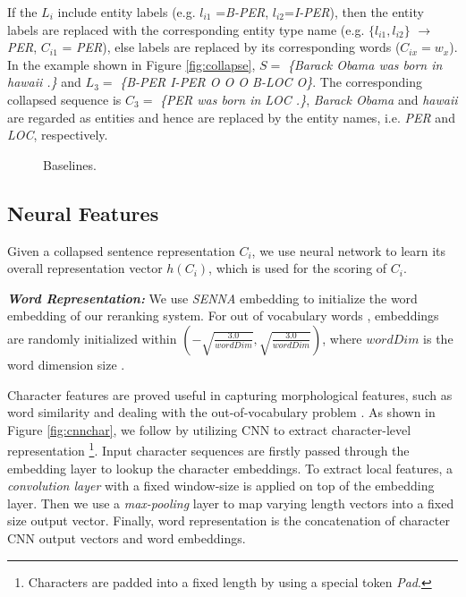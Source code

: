 \documentclass[11pt,a4paper]{article}
\begin{document}
If the $L_i$ include entity labels (e.g. $l_{i1}$ =\textit{B-PER}, $l_{i2}$=\textit{I-PER}), then the entity labels are replaced with the corresponding entity type name (e.g. $\{l_{i1},l_{i2}\}$ $\rightarrow$ \textit{PER},  $C_{i1}$ = \textit{PER}), else labels are replaced by its corresponding words ($C_{ix} = w_x$). In the example shown in Figure \ref{fig:collapse}, $S=$ \textit{\{Barack Obama was born in hawaii .\}} and $L_3=$ \textit{\{B-PER I-PER O O O B-LOC O\}}. The corresponding collapsed sequence is $C_3=$ \textit{\{PER was born in LOC .\}}, \textit{Barack Obama} and \textit{hawaii} are regarded as entities and hence are replaced by the entity names, i.e. \textit{PER} and \textit{LOC}, respectively. 




\begin{figure}[!t] 
  \centering 
  \caption{Baselines.} 
  \label{baselines} \end{figure}



\subsection{Neural Features}
Given a collapsed sentence representation $C_i$, we use neural network to learn its overall representation vector $h(C_i)$, which is used for the scoring of $C_i$. 

\textit{\textbf{Word Representation:}} We use \textit{SENNA} \cite{collobert2011natural} embedding to initialize the word embedding of our reranking system. For out of vocabulary words , embeddings are randomly initialized within $(-\sqrt{\frac{3.0}{wordDim}},\sqrt{\frac{3.0}{wordDim}})$, where $wordDim$ is the word dimension size \cite{ma2016end}. 

Character features are proved useful in capturing morphological features, such as word similarity and dealing with the out-of-vocabulary problem \cite{ling2015finding}. As shown in Figure \ref{fig:cnnchar}, we follow \citet{ma2016end} by utilizing CNN to extract character-level representation \footnote{Characters are padded into a fixed length by using a special token \textit{Pad}.}. Input character sequences are firstly passed through the embedding layer to lookup the character embeddings. To extract local features, a \textit{convolution layer} with a fixed window-size is applied on top of the embedding layer. Then we use a \textit{max-pooling} layer to map varying length vectors into a fixed size output vector. Finally, word representation is the concatenation of character CNN output vectors and word embeddings.
\end{document}

